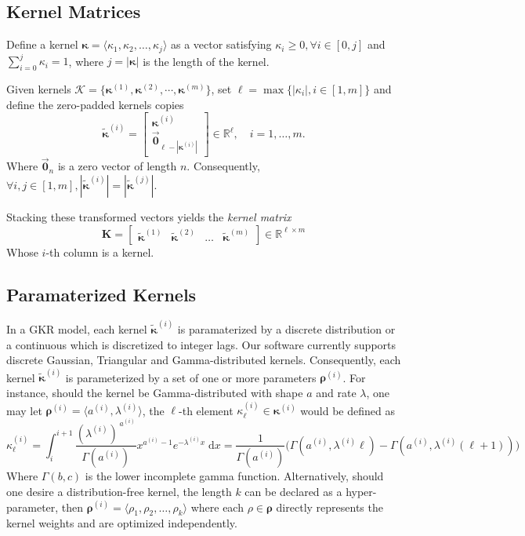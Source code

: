 \documentclass{article}
\begin{document}
	
	\subsection*{Kernel Matrices}
	Define a kernel $\boldsymbol{\kappa} = \langle \kappa_1, \kappa_2, \dots, \kappa_j \rangle$ as a vector satisfying $\kappa_i \geq 0, \forall i \in [0, j]$ and $\sum_{i=0}^{j}\kappa_i = 1$, where $j = |\boldsymbol{\kappa}|$ is the length of the kernel. 
	
	Given kernels $\mathcal{K} = \{\boldsymbol{\kappa}^{(1)}, \boldsymbol{\kappa}^{(2)}, \dotsm, \boldsymbol{\kappa}^{(m)} \}$, set $\ell = \max \{ |{\kappa}_i|, i \in [1,m]\}$ and define the zero-padded kernels copies
	$$
	\tilde{\boldsymbol{\kappa}}^{(i)} = \begin{bmatrix} \boldsymbol{\kappa}^{(i)} \\
		\vec{\mathbf{0}}_{\ell - |\boldsymbol{\kappa}^{(i)}|}\end{bmatrix}
	\in \mathbb{R}^{\ell},\quad i=1,\dots,m.
	$$
	Where $\vec{\mathbf{0}}_n$ is a zero vector of length $n$. Consequently, $\forall i,j \in [1,m], |\tilde{\boldsymbol{\kappa}}^{(i)}| = |\tilde{\boldsymbol{\kappa}}^{(j)}|$.
	
	Stacking these transformed vectors yields the \textit{kernel matrix}
	$$
	\mathbf{K} = \begin{bmatrix} \tilde{\boldsymbol{\kappa}}^{(1)} & \tilde{\boldsymbol{\kappa}}^{(2)} & \dots & \tilde{\boldsymbol{\kappa}}^{(m)}\end{bmatrix} \in \mathbb{R}^{\ell \times m}
	$$
	Whose $i$-th column is a kernel.
	
	\subsection*{Paramaterized Kernels}
	In a GKR model, each kernel $\tilde{\boldsymbol{\kappa}}^{(i)}$ is paramaterized by a discrete distribution or a continuous which is discretized to integer lags. Our software currently supports discrete Gaussian, Triangular and Gamma-distributed kernels. Consequently, each kernel $\tilde{\boldsymbol{\kappa}}^{(i)}$ is parameterized by a set of one or more parameters $\boldsymbol{\rho}^{(i)}$. For instance, should the kernel be Gamma-distributed with shape $a$ and rate $\lambda$, one may let $\boldsymbol{\rho}^{(i)} = \langle a^{(i)}, \lambda^{(i)} \rangle $, the $\ell$-th element $\kappa_{\ell}^{(i)} \in \boldsymbol{\kappa}^{(i)}$ would be defined as
	$$
	\kappa_\ell^{(i)} = \int_{i}^{i+1} \dfrac{(\lambda^{(i)})^{\,  a^{(i)}}}{\Gamma( a^{(i)}) }x^{ a^{(i)}-1}e^{-\lambda^{(i)} x} \;\text{d}x = \dfrac{1}{\Gamma( a^{(i)})}\Big( \Gamma( a^{(i)}, \lambda^{(i)} \ell) - \Gamma( a^{(i)}, \lambda^{(i)} (\ell + 1)  )\Big)
	$$
	Where $\Gamma(b, c)$ is the lower incomplete gamma function.
	Alternatively, should one desire a distribution-free kernel, the length $k$ can be declared as a hyper-parameter, then $\boldsymbol{\rho}^{(i)} = \langle \rho_1, \rho_2, \dots, \rho_k \rangle$ where each $\rho \in \boldsymbol{\rho}$ directly represents the kernel weights and are optimized independently. 
	
\end{document}
